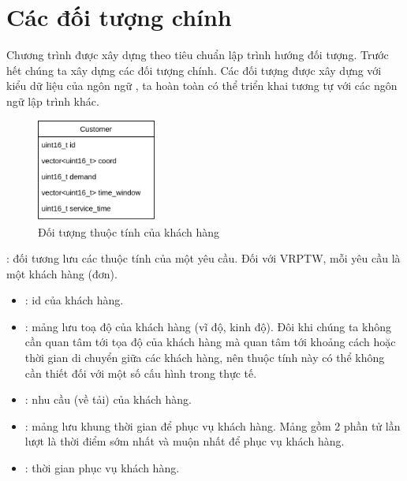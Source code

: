 \section{Các đối tượng chính}
Chương trình được xây dựng theo tiêu chuẩn lập trình hướng đối tượng. Trước hết chúng ta xây dựng các đối tượng chính. Các đối tượng được xây dựng với kiểu dữ liệu của ngôn ngữ , ta hoàn toàn có thể triển khai tương tự với các ngôn ngữ lập trình khác.

\begin{figure}[H] %
  \centering %
  \includegraphics[width=0.35\textwidth]{figures/Customer.png} 
  \caption{Đối tượng thuộc tính của khách hàng} 
  \label{fig:fg_02}
\end{figure}

: đối tương lưu các thuộc tính của một yêu cầu. Đối với VRPTW, mỗi yêu cầu là một khách hàng (đơn).

\begin{itemize}
  \item {}: id của khách hàng.
  \item {}: mảng lưu toạ độ của khách hàng (vĩ độ, kinh độ). Đôi khi chúng ta không cần quan tâm tới tọa độ của khách hàng mà quan tâm tới khoảng cách hoặc thời gian di chuyển giữa các khách hàng, nên thuộc tính này có thể không cần thiết đối với một số cấu hình trong thực tế.
  \item {}: nhu cầu (về tải) của khách hàng.
  \item {}: mảng lưu khung thời gian để phục vụ khách hàng. Mảng gồm 2 phần tử lần lượt là thời điểm sớm nhất và muộn nhất để phục vụ khách hàng.
  \item {}: thời gian phục vụ khách hàng.
\end{itemize}

